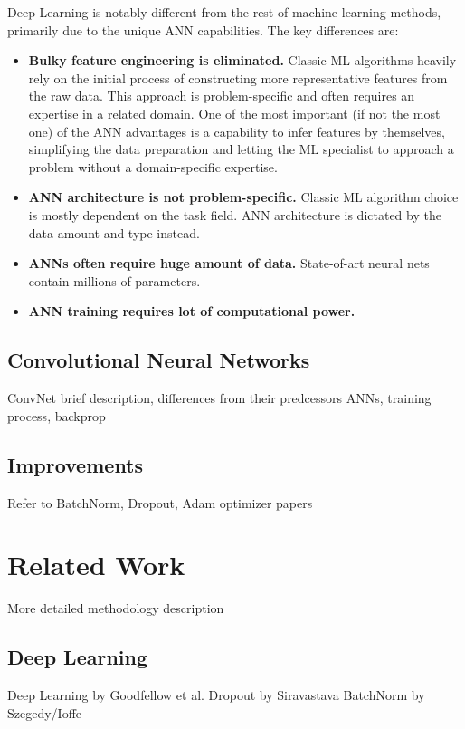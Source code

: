 \documentclass[thesis=B,english]{FITthesis}[2019/12/23]
\begin{document}
Deep Learning is notably different from the rest of machine learning methods, primarily due to the unique ANN capabilities. The key differences are:
\begin{itemize}
	\item \textbf{Bulky feature engineering is eliminated.} Classic ML algorithms heavily rely on the initial process of constructing more representative features from the raw data. This approach is problem-specific and often requires an expertise in a related domain. One of the most important (if not the most one) of the ANN advantages is a capability to infer features by themselves, simplifying the data preparation and letting the ML specialist to approach a problem without a domain-specific expertise.
	\item \textbf{ANN architecture is not problem-specific.} Classic ML algorithm choice is mostly dependent on the task field. ANN architecture is dictated by the data amount and type instead.
	\item \textbf{ANNs often require huge amount of data.} State-of-art neural nets contain millions of parameters.
	\item \textbf{ANN training requires lot of computational power.} 
\end{itemize}

\section{Convolutional Neural Networks}

ConvNet brief description, differences from their predcessors ANNs, training process, backprop

\section{Improvements}

Refer to BatchNorm, Dropout, Adam optimizer papers

\chapter{Related Work}

More detailed methodology description

\section{Deep Learning}

Deep Learning by Goodfellow et al.
Dropout by Siravastava
BatchNorm by Szegedy/Ioffe
\end{document}

